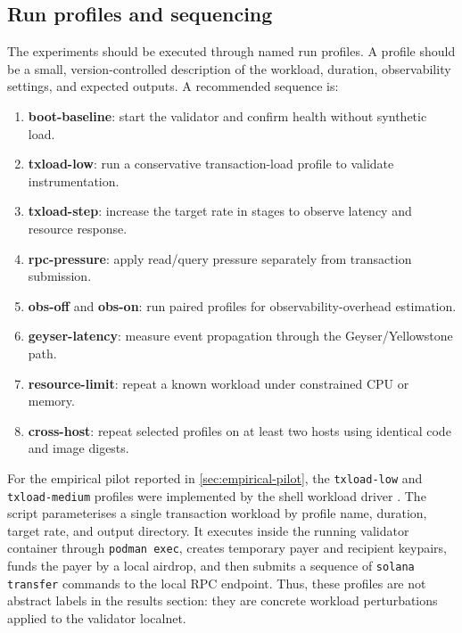 \documentclass[11pt,a4paper]{article}
\begin{document}
\subsection{Run profiles and sequencing}
\label{subsec:run-profiles}

The experiments should be executed through named run profiles. A profile should be a small, version-controlled description of the workload, duration, observability settings, and expected outputs. A recommended sequence is:

\begin{enumerate}
  \item \textbf{boot-baseline}: start the validator and confirm health without synthetic load.
  \item \textbf{txload-low}: run a conservative transaction-load profile to validate instrumentation.
  \item \textbf{txload-step}: increase the target rate in stages to observe latency and resource response.
  \item \textbf{rpc-pressure}: apply read/query pressure separately from transaction submission.
  \item \textbf{obs-off} and \textbf{obs-on}: run paired profiles for observability-overhead estimation.
  \item \textbf{geyser-latency}: measure event propagation through the Geyser/Yellowstone path.
  \item \textbf{resource-limit}: repeat a known workload under constrained CPU or memory.
  \item \textbf{cross-host}: repeat selected profiles on at least two hosts using identical code and image digests.
\end{enumerate}


For the empirical pilot reported in \cref{sec:empirical-pilot}, the \texttt{txload-low} and \texttt{txload-medium} profiles were implemented by the shell workload driver . The script parameterises a single transaction workload by profile name, duration, target rate, and output directory. It executes inside the running validator container through \texttt{podman exec}, creates temporary payer and recipient keypairs, funds the payer by a local airdrop, and then submits a sequence of \texttt{solana transfer} commands to the local RPC endpoint. Thus, these profiles are not abstract labels in the results section: they are concrete workload perturbations applied to the validator localnet.
\end{document}
